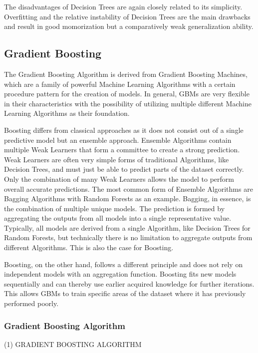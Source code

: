 The disadvantages of Decision Trees are again closely related to its simplicity. Overfitting and 
the relative instability of Decision Trees are the main drawbacks and result in good momorization 
but a comparatively weak generalization ability.

\subsection{Gradient Boosting}

The Gradient Boosting Algorithm is derived from Gradient Boosting Machines, which are a family of 
powerful Machine Learning Algorithms with a certain procedure pattern for the creation of models. 
In general, GBMs are very flexible in their characteristics with the possibility of utilizing 
multiple different Machine Learning Algorithms as their foundation.

Boosting differs from classical approaches as it does not consist out of a single predictive 
model but an ensemble approach. Ensemble Algorithms contain multiple Weak Learners that form a 
committee to create a strong prediction. Weak Learners are often very simple forms of traditional 
Algorithms, like Decision Trees, and must just be able to predict parts of the dataset correctly. 
Only the combination of many Weak Learners allows the model to perform overall accurate 
predictions. The most common form of Ensemble Algorithms are Bagging Algorithms with Random 
Forests as an example. Bagging, in essence, is the combination of multiple unique models. The 
prediction is formed by aggregating the outputs from all models into a single representative 
value. Typically, all models are derived from a single Algorithm, like Decision Trees for Random 
Forests, but technically there is no limitation to aggregate outputs from different Algorithms. 
This is also the case for Boosting. 

Boosting, on the other hand, follows a different principle and does not rely on independent 
models with an aggregation function. Boosting fits new models sequentially and can thereby use 
earlier acquired knowledge for further iterations. This allows GBMs to train specific areas of 
the dataset where it has previously performed poorly.  

\subsubsection{Gradient Boosting Algorithm}

(1) GRADIENT BOOSTING ALGORITHM 

